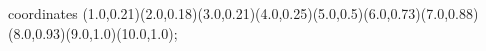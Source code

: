 					coordinates { (1.0,0.21)(2.0,0.18)(3.0,0.21)(4.0,0.25)(5.0,0.5)(6.0,0.73)(7.0,0.88)(8.0,0.93)(9.0,1.0)(10.0,1.0)};